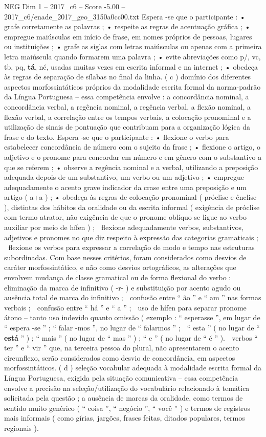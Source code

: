 \begin{textsample}{NEG Dim 1 – 2017\_c6 – Score -5.00 – 2017\_c6/enade\_2017\_geo\_3150a0cc00.txt}
Espera -se que o participante : • grafe corretamente as palavras ; • respeite as regras de acentuação gráfica ; • empregue maiúsculas em início de frase, em nomes próprios de pessoas, lugares ou instituições ; • grafe as siglas com letras maiúsculas ou apenas com a primeira letra maiúscula quando formarem uma palavra ; • evite abreviações como p/, vc, tb, pq, \textbf{tá}, né, usadas muitas vezes em escrita informal e na internet ; • obedeça às regras de separação de sílabas no final da linha. ( c ) domínio dos diferentes aspectos morfossintáticos próprios da modalidade escrita formal da norma-padrão da Língua Portuguesa – essa competência envolve : a concordância nominal, a concordância verbal, a regência nominal, a regência verbal, a flexão nominal, a flexão verbal, a correlação entre os tempos verbais, a colocação pronominal e a utilização de sinais de pontuação que contribuam para a organização lógica da frase e do texto.
Espera -se que o participante : • flexione o verbo para estabelecer concordância de número com o sujeito da frase ; • flexione o artigo, o adjetivo e o pronome para concordar em número e em gênero com o substantivo a que se referem ; • observe a regência nominal e a verbal, utilizando a preposição adequada depois de um substantivo, um verbo ou um adjetivo ; • empregue adequadamente o acento grave indicador da crase entre uma preposição e um artigo ( a+a ) ; • obedeça às regras de colocação pronominal ( próclise e ênclise ), distintas dos hábitos da oralidade ou da escrita informal ( exigência de próclise com termo atrator, não exigência de que o pronome oblíquo se ligue ao verbo auxiliar por meio de hífen ) ;  flexione adequadamente verbos, substantivos, adjetivos e pronomes no que diz respeito à expressão das categorias gramaticais ;  flexione os verbos para expressar a correlação de modo e tempo nas estruturas subordinadas.
Com base nesses critérios, foram considerados como desvios de caráter morfossintático, e não como desvios ortográficos, as alterações que envolvem mudança de classe gramatical ou de forma flexional do verbo :  eliminação da marca de infinitivo ( -r- ) e substituição por acento agudo ou ausência total de marca do infinitivo ;  confusão entre “ ão ” e “ am ” nas formas verbais ;  confusão entre “ há ” e “ a ” ;  uso de hífen para separar pronome átono – tanto uso indevido quanto omissão ( exemplo : “ esperasse ”, em lugar de “ espera -se ” ; “ falar -mos ”, no lugar de “ falarmos ” ;  “ esta ” ( no lugar de “ \textbf{está} ” ) ; “ mais ” ( no lugar de “ mas ” ) ; “ e ” ( no lugar de “ é ” ).  verbos “ ter ” e “ vir ” que, na terceira pessoa do plural, não apresentarem o acento circunflexo, serão considerados como desvio de concordância, em aspectos morfossintáticos. ( d ) seleção vocabular adequada à modalidade escrita formal da Língua Portuguesa, exigida pela situação comunicativa – essa competência envolve a precisão na seleção/utilização do vocabulário relacionado à temática solicitada pela questão ; a ausência de marcas da oralidade, como termos de sentido muito genérico ( “ coisa ”, “ negócio ”, “ você ” ) e termos de registros mais informais ( como gírias, jargões, frases feitas, ditados populares, termos regionais ).

\end{textsample}
